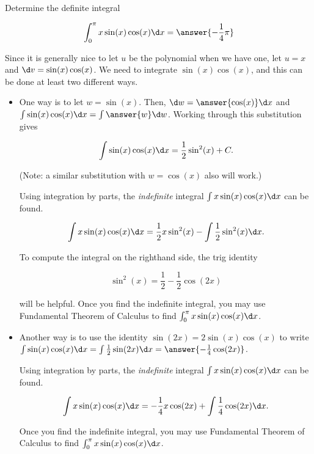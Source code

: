 \documentclass{ximera}
\author{Jason Miller and Jim Talamo}
\begin{document}
\begin{exercise}
Determine the definite integral 

\[
\int_0^{\pi} x\sin(x) \cos(x) \d x = \answer{-\frac{1}{4} \pi}
\]

\begin{hint}
Since it is generally nice to let $u$ be the polynomial when we have one, let $u = x$ and $\d v = \sin(x) \cos(x)$.  We need to integrate $\sin(x) \cos(x)$, and this can be done at least two different ways.

\begin{itemize}
\item One way is to let $w=\sin(x)$.  Then, $\d w = \answer{\cos(x)} \d x$ and $\int \sin(x) \cos(x) \d x = \int \answer{w} \d w$.  Working through this substitution gives

\[
\int \sin(x) \cos(x) \d x = \frac{1}{2}\sin^2(x)+C.
\]
 
(Note: a similar substitution with $w=\cos(x)$ also will work.)

Using integration by parts, the \emph{indefinite} integral $\int x\sin(x) \cos(x) \d x$ can be found.

\[
\int x\sin(x) \cos(x) \d x =\frac{1}{2}x\sin^2(x) - \int \frac{1}{2} \sin^2(x) \d x. 
\]

To compute the integral on the righthand side, the trig identity

\[
\sin^2(x) = \frac{1}{2} - \frac{1}{2} \cos(2x)
\] 

will be helpful.  Once you find the indefinite integral, you may use Fundamental Theorem of Calculus to find $\int_0^{\pi} x\sin(x) \cos(x) \d x $.

 \item Another way is to use the identity $\sin(2x) = 2 \sin(x)\cos(x)$ to write $\int  \sin(x)\cos(x) \d x = \int \frac{1}{2} \sin(2x) \d x = \answer{-\frac{1}{4}\cos(2x)}$.

Using integration by parts, the \emph{indefinite} integral $\int x\sin(x) \cos(x) \d x$ can be found.

\[
\int x\sin(x) \cos(x) \d x =-\frac{1}{4}x\cos(2x) + \int \frac{1}{4} \cos(2x) \d x. 
\]

Once you find the indefinite integral, you may use Fundamental Theorem of Calculus to find $\int_0^{\pi} x\sin(x) \cos(x) \d x $.

\end{itemize}
 
\end{hint}


\end{exercise}
\end{document}
